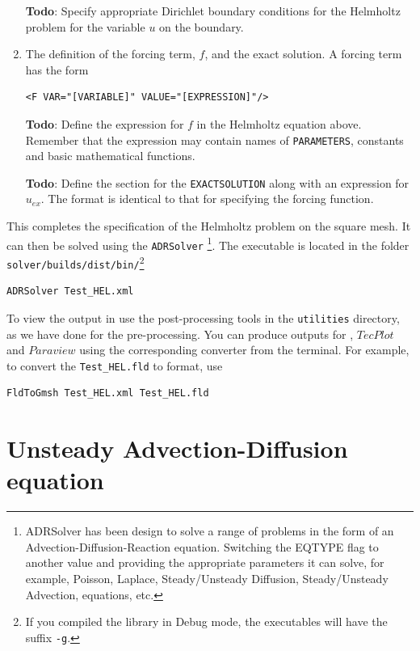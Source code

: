\documentclass[a4paper,12pt]{article}
\begin{document}
\begin{enumerate}
\textbf{Todo}: Specify appropriate Dirichlet boundary conditions for
the Helmholtz problem for the variable $u$ on the boundary.

\item The definition of the forcing term, $f$, and the exact solution. A forcing
term has the form
\begin{verbatim}
<F VAR="[VARIABLE]" VALUE="[EXPRESSION]"/>
\end{verbatim}

\textbf{Todo}: Define the expression for $f$ in the Helmholtz equation above.
Remember that the expression may contain names of \texttt{PARAMETERS},
constants and basic mathematical functions.

\textbf{Todo}: Define the section for the \texttt{EXACTSOLUTION} along with an
expression for $u_{ex}$. The format is identical to that for specifying the
forcing function.

\end{enumerate}

This completes the specification of the Helmholtz problem on the square mesh.
It can then be solved using the \texttt{ADRSolver}
\footnote{ADRSolver has been design to solve a range of problems in the form of
an Advection-Diffusion-Reaction equation. Switching the EQTYPE flag to
another value and providing the appropriate parameters it can solve, for
example, Poisson, Laplace, Steady/Unsteady Diffusion, Steady/Unsteady Advection,
equations, etc.}. The executable is located in the folder
\texttt{solver/builds/dist/bin/}\footnote{If you compiled the library in Debug
mode, the executables will have the suffix \texttt{-g}.}

\begin{verbatim}
ADRSolver Test_HEL.xml
\end{verbatim}

To view the output in \gmsh use the post-processing
tools in the \texttt{utilities} directory, as we have done for the
pre-processing. You can produce outputs for \gmsh, $TecPlot$ and $Paraview$
using the corresponding converter from the terminal. For example, to convert the
\texttt{Test\_HEL.fld} to \gmsh format, use

\begin{verbatim}
FldToGmsh Test_HEL.xml Test_HEL.fld
\end{verbatim} 


\clearpage
\section{Unsteady Advection-Diffusion equation}
\end{document}
